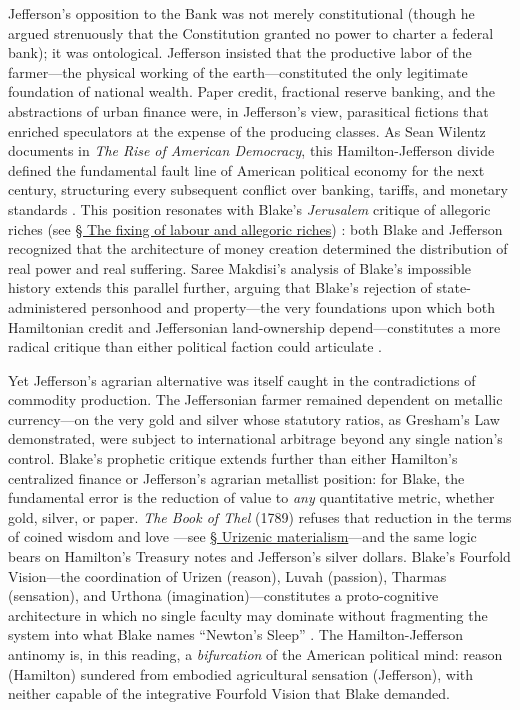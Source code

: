 \documentclass[
]{article}
\begin{document}
Jefferson's opposition to the Bank was not merely constitutional (though
he argued strenuously that the Constitution granted no power to charter
a federal bank); it was ontological. Jefferson insisted that the
productive labor of the farmer---the physical working of the
earth---constituted the only legitimate foundation of national wealth.
Paper credit, fractional reserve banking, and the abstractions of urban
finance were, in Jefferson's view, parasitical fictions that enriched
speculators at the expense of the producing classes. As Sean Wilentz
documents in \emph{The Rise of American Democracy}, this
Hamilton-Jefferson divide defined the fundamental fault line of American
political economy for the next century, structuring every subsequent
conflict over banking, tariffs, and monetary standards
\citep{wilentz2005rise}. This position resonates with Blake's
\emph{Jerusalem} critique of allegoric riches (see
\hyperref[sec-allegoric-riches]{§ The fixing of labour and allegoric
riches}) \citep{erdman1988complete, sklar2011blake}: both Blake and
Jefferson recognized that the architecture of money creation determined
the distribution of real power and real suffering. Saree Makdisi's
analysis of Blake's impossible history extends this parallel further,
arguing that Blake's rejection of state-administered personhood and
property---the very foundations upon which both Hamiltonian credit and
Jeffersonian land-ownership depend---constitutes a more radical critique
than either political faction could articulate
\citep{makdisi2003william, makdisi2014reading}.

Yet Jefferson's agrarian alternative was itself caught in the
contradictions of commodity production. The Jeffersonian farmer remained
dependent on metallic currency---on the very gold and silver whose
statutory ratios, as Gresham's Law demonstrated, were subject to
international arbitrage beyond any single nation's control. Blake's
prophetic critique extends further than either Hamilton's centralized
finance or Jefferson's agrarian metallist position: for Blake, the
fundamental error is the reduction of value to \emph{any} quantitative
metric, whether gold, silver, or paper. \emph{The Book of Thel} (1789)
refuses that reduction in the terms of coined wisdom and love
\citep{blake1789thel}---see \hyperref[sec-urizenic-materialism]{§
Urizenic materialism}---and the same logic bears on Hamilton's Treasury
notes and Jefferson's silver dollars. Blake's Fourfold Vision---the
coordination of Urizen (reason), Luvah (passion), Tharmas (sensation),
and Urthona (imagination)---constitutes a proto-cognitive architecture
in which no single faculty may dominate without fragmenting the system
into what Blake names ``Newton's Sleep''
\citep{friedman2026blake, friedman2026doors}. The Hamilton-Jefferson
antinomy is, in this reading, a \emph{bifurcation} of the American
political mind: reason (Hamilton) sundered from embodied agricultural
sensation (Jefferson), with neither capable of the integrative Fourfold
Vision that Blake demanded.
\end{document}
